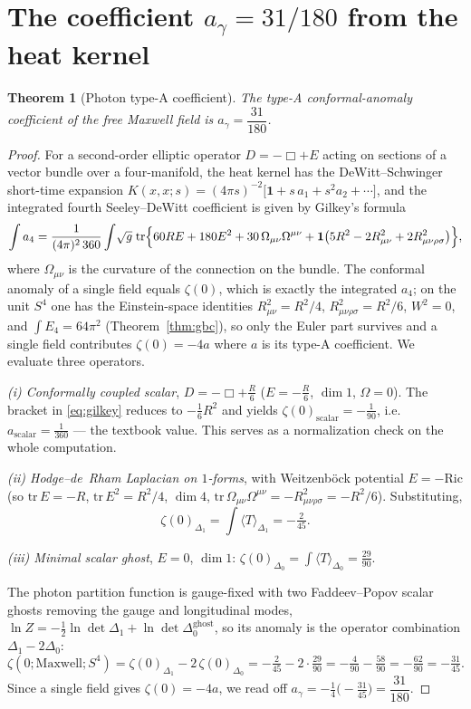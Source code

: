 \documentclass[11pt,a4paper]{article}
\newtheorem{theorem}{Theorem}
\theoremstyle{definition}
\theoremstyle{remark}
\newcommand{\ag}{a_\gamma}
\newcommand{\avg}[1]{\langle #1\rangle}
\begin{document}
\section{The coefficient $\ag=31/180$ from the heat kernel}\label{sec:heat}
\begin{theorem}[Photon type-A coefficient]\label{thm:agamma}
The type-A conformal-anomaly coefficient of the free Maxwell field is $\ag=\dfrac{31}{180}$.
\end{theorem}
\begin{proof}
For a second-order elliptic operator $D=-\Box+E$ acting on sections of a vector bundle over a
four-manifold, the heat kernel has the DeWitt--Schwinger short-time expansion
$K(x,x;s)=(4\pi s)^{-2}\bigl[\mathbf 1+s\,a_1+s^2 a_2+\cdots\bigr]$, and the integrated fourth
Seeley--DeWitt coefficient is given by Gilkey's formula \cite{Gilkey}
\begin{equation}\label{eq:gilkey}
\int a_4=\frac{1}{(4\pi)^2\,360}\int\!\sqrt g\;\mathrm{tr}\Bigl\{60RE+180E^2+30\,\Omega_{\mu\nu}\Omega^{\mu\nu}
+\mathbf 1\bigl(5R^2-2R_{\mu\nu}^2+2R_{\mu\nu\rho\sigma}^2\bigr)\Bigr\},
\end{equation}
where $\Omega_{\mu\nu}$ is the curvature of the connection on the bundle. The conformal anomaly of
a single field equals $\zeta(0)$, which is exactly the integrated $a_4$; on the unit $S^4$ one has
the Einstein-space identities $R_{\mu\nu}^2=R^2/4$, $R_{\mu\nu\rho\sigma}^2=R^2/6$, $W^2=0$, and
$\int E_4=64\pi^2$ (Theorem~\ref{thm:gbc}), so only the Euler part survives and a single field
contributes $\zeta(0)=-4a$ where $a$ is its type-A coefficient. We evaluate three operators.

\smallskip
\emph{(i) Conformally coupled scalar}, $D=-\Box+\tfrac R6$ ($E=-\tfrac R6$, $\dim 1$,
$\Omega=0$). The bracket in \eqref{eq:gilkey} reduces to $-\tfrac16 R^2$ and yields
$\zeta(0)_{\mathrm{scalar}}=-\tfrac1{90}$, i.e. $a_{\mathrm{scalar}}=\tfrac1{360}$ --- the
textbook value. This serves as a normalization check on the whole computation.

\emph{(ii) Hodge--de~Rham Laplacian on $1$-forms}, with Weitzenb\"ock potential $E=-\mathrm{Ric}$
(so $\mathrm{tr}\,E=-R$, $\mathrm{tr}\,E^2=R^2/4$, $\dim 4$,
$\mathrm{tr}\,\Omega_{\mu\nu}\Omega^{\mu\nu}=-R_{\mu\nu\rho\sigma}^2=-R^2/6$). Substituting,
\[
\zeta(0)_{\Delta_1}=\int\avg{T}_{\Delta_1}=-\tfrac{2}{45}.
\]

\emph{(iii) Minimal scalar ghost}, $E=0$, $\dim 1$: $\zeta(0)_{\Delta_0}=\int\avg{T}_{\Delta_0}=\tfrac{29}{90}$.

\smallskip
The photon partition function is gauge-fixed with two Faddeev--Popov scalar ghosts removing the
gauge and longitudinal modes, $\ln Z=-\tfrac12\ln\det\Delta_1+\ln\det\Delta_0^{\mathrm{ghost}}$, so
its anomaly is the operator combination $\Delta_1-2\Delta_0$:
\begin{equation}\label{eq:zetacombo}
\zeta(0;\mathrm{Maxwell};S^4)=\zeta(0)_{\Delta_1}-2\,\zeta(0)_{\Delta_0}
=-\tfrac{2}{45}-2\cdot\tfrac{29}{90}=-\tfrac{4}{90}-\tfrac{58}{90}=-\tfrac{62}{90}=-\tfrac{31}{45}.
\end{equation}
Since a single field gives $\zeta(0)=-4a$, we read off
$\ag=-\tfrac14\bigl(-\tfrac{31}{45}\bigr)=\dfrac{31}{180}$.
\end{proof}
\end{document}
